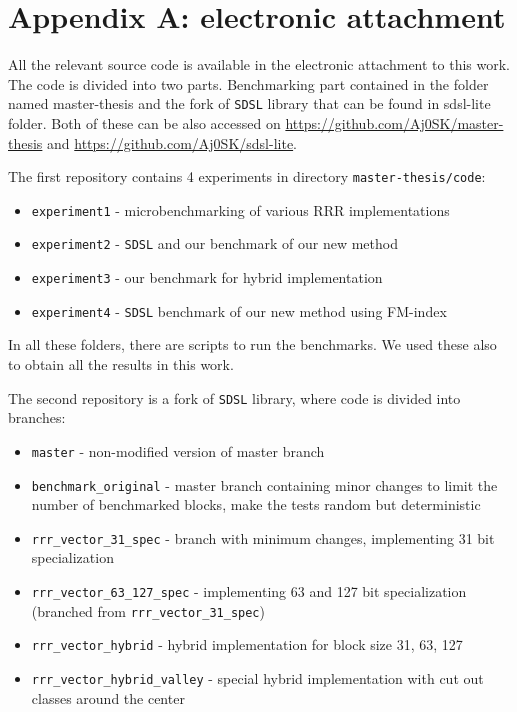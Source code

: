 \chapter*{Appendix A: electronic attachment}

All the relevant source code is available in the electronic attachment to this work.
The code is divided into two parts. Benchmarking part contained in the folder named
master-thesis and the fork of \texttt{SDSL} library that can be found in sdsl-lite folder.
Both of these can be also accessed on \url{https://github.com/Aj0SK/master-thesis} and
\url{https://github.com/Aj0SK/sdsl-lite}.

The first repository contains 4 experiments in directory \texttt{master-thesis/code}:
\begin{itemize}
    \item \texttt{experiment1} - microbenchmarking of various RRR implementations
    \item \texttt{experiment2} - \texttt{SDSL} and our benchmark of our new method
    \item \texttt{experiment3} - our benchmark for hybrid implementation
    \item \texttt{experiment4} - \texttt{SDSL} benchmark of our new method using FM-index
\end{itemize}
In all these folders, there are scripts to run the benchmarks. We used these also to obtain
all the results in this work. 

The second repository is a fork of \texttt{SDSL} library, where code is divided into
branches:
\begin{itemize}
    \item \texttt{master} - non-modified version of master branch
    \item \texttt{benchmark\_original} - master branch containing minor changes
        to limit the number of benchmarked blocks, make the tests random but deterministic
    \item \texttt{rrr\_vector\_31\_spec} - branch with minimum changes, implementing 31 bit specialization
    \item \texttt{rrr\_vector\_63\_127\_spec} - implementing 63 and 127 bit specialization (branched from \texttt{rrr\_vector\_31\_spec})
    \item \texttt{rrr\_vector\_hybrid} - hybrid implementation for block size 31, 63, 127
    \item \texttt{rrr\_vector\_hybrid\_valley} - special hybrid implementation with cut out classes around the center
\end{itemize}
